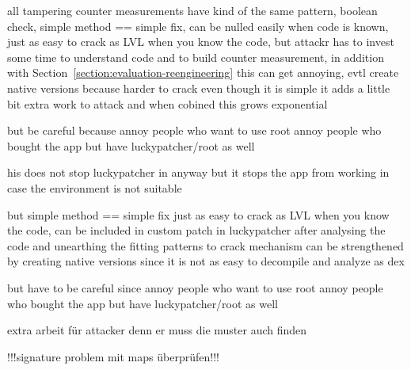 all tampering counter measurements have kind of the same pattern, boolean check, simple method == simple fix, can be nulled easily when code is known, just as easy to crack as LVL when you know the code, but attackr has to invest some time to understand code and to build counter measurement, in addition with Section~\ref{section:evaluation-reengineering} this can get annoying, evtl create native versions because harder to crack
even though it is simple it adds a little bit extra work to attack and when cobined this grows exponential

but be careful because
annoy people who want to use root
annoy people who bought the app but have luckypatcher/root as well

his does not stop luckypatcher in anyway but it stops the app from working in case the environment is not suitable

but simple method == simple fix
just as easy to crack as LVL when you know the code, can be included in custom patch in luckypatcher after analysing the code and unearthing the fitting patterns to crack
mechanism can be strengthened by creating native versions since it is not as easy to decompile and analyze as dex

but have to be careful since
annoy people who want to use root
annoy people who bought the app but have luckypatcher/root as well

extra arbeit für attacker denn er muss die muster auch finden

!!!signature problem  mit maps überprüfen!!!
